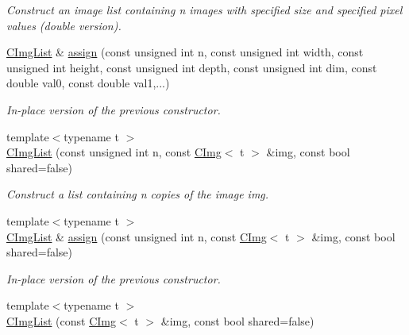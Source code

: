 \begin{DoxyCompactItemize}
\begin{DoxyCompactList}\small\item\em Construct an image list containing n images with specified size and specified pixel values (double version). \end{DoxyCompactList}\item 
\hypertarget{structcimg__library_1_1_c_img_list_a446d7942e39774d932f9b5e3250710ed}{\hyperlink{structcimg__library_1_1_c_img_list}{C\-Img\-List} \& \hyperlink{structcimg__library_1_1_c_img_list_a446d7942e39774d932f9b5e3250710ed}{assign} (const unsigned int n, const unsigned int width, const unsigned int height, const unsigned int depth, const unsigned int dim, const double val0, const double val1,...)}\label{structcimg__library_1_1_c_img_list_a446d7942e39774d932f9b5e3250710ed}

\begin{DoxyCompactList}\small\item\em In-\/place version of the previous constructor. \end{DoxyCompactList}\item 
\hypertarget{structcimg__library_1_1_c_img_list_a2fb78e4252e531ff0e9b8abd7fe631bf}{{\footnotesize template$<$typename t $>$ }\\\hyperlink{structcimg__library_1_1_c_img_list_a2fb78e4252e531ff0e9b8abd7fe631bf}{C\-Img\-List} (const unsigned int n, const \hyperlink{structcimg__library_1_1_c_img}{C\-Img}$<$ t $>$ \&img, const bool shared=false)}\label{structcimg__library_1_1_c_img_list_a2fb78e4252e531ff0e9b8abd7fe631bf}

\begin{DoxyCompactList}\small\item\em Construct a list containing n copies of the image img. \end{DoxyCompactList}\item 
\hypertarget{structcimg__library_1_1_c_img_list_a11df9863dd6b3afb27d935bb6dcee4f6}{{\footnotesize template$<$typename t $>$ }\\\hyperlink{structcimg__library_1_1_c_img_list}{C\-Img\-List} \& \hyperlink{structcimg__library_1_1_c_img_list_a11df9863dd6b3afb27d935bb6dcee4f6}{assign} (const unsigned int n, const \hyperlink{structcimg__library_1_1_c_img}{C\-Img}$<$ t $>$ \&img, const bool shared=false)}\label{structcimg__library_1_1_c_img_list_a11df9863dd6b3afb27d935bb6dcee4f6}

\begin{DoxyCompactList}\small\item\em In-\/place version of the previous constructor. \end{DoxyCompactList}\item 
\hypertarget{structcimg__library_1_1_c_img_list_a3ed92a0da0ff72d4b3571fd3293af667}{{\footnotesize template$<$typename t $>$ }\\\hyperlink{structcimg__library_1_1_c_img_list_a3ed92a0da0ff72d4b3571fd3293af667}{C\-Img\-List} (const \hyperlink{structcimg__library_1_1_c_img}{C\-Img}$<$ t $>$ \&img, const bool shared=false)}\label{structcimg__library_1_1_c_img_list_a3ed92a0da0ff72d4b3571fd3293af667}


\end{DoxyCompactItemize}
